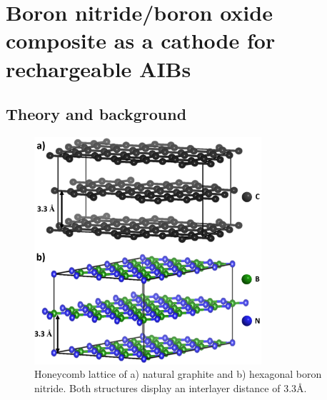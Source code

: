 \chapter{Boron nitride/boron oxide composite as a cathode for rechargeable AIBs} 
\label{BOhBN} 

\section{Theory and background}

\begin{figure}[tbh!]
\centering
\includegraphics[width=0.75\textwidth]{Figures/BOhBN/grpBNcomp}
\caption{Honeycomb lattice of a) natural graphite and b) hexagonal boron nitride. Both structures display an interlayer distance of 3.3\AA.}
\label{Figures/BOhBN:grpBNcomp}
\end{figure}

